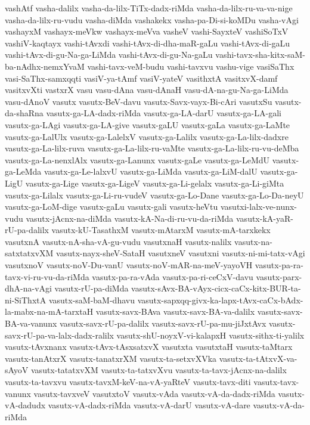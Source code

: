 {vashAtf
vasha-dalilx
vasha-da-lilx-TiTx-dadx-riMda
vasha-da-lilx-ru-va-va-nige
vasha-da-lilx-ru-vudu
vasha-diMda
vashakekx
vasha-pa-Di-si-koMDu
vasha-vAgi
vashayxM
vashayx-meVkw
vashayx-meVva
vasheV
vashi-SayxteV
vashiSoTxV
vashiV-kaqtayx
vashi-tAvxdi
vashi-tAvx-di-dha-maR-gaLu
vashi-tAvx-di-gaLu
vashi-tAvx-di-gu-Na-ga-LiMda
vashi-tAvx-di-gu-Na-gaLu
vashi-tavx-sha-kitx-saM-ba-nAdhx-nemxYvaM
vashi-tavx-veM-budu
vashi-tavxvu
vashu-vige
vasiSaThx
vasi-SaThx-samxqqti
vasiV-ya-tAmf
vasiV-yateV
vasithxtA
vasitxvX-damf
vasitxvXti
vastxrX
vasu
vasu-dAna
vasu-dAnaH
vasu-dA-na-gu-Na-ga-LiMda
vasu-dAnoV
vasutx
vasutx-BeV-davu
vasutx-Savx-vayx-Bi-cAri
vasutxSu
vasutx-da-shaRna
vasutx-ga-LA-dadx-riMda
vasutx-ga-LA-darU
vasutx-ga-LA-gali
vasutx-ga-LAgi
vasutx-ga-LA-give
vasutx-gaLU
vasutx-gaLa
vasutx-ga-LaMte
vasutx-ga-LalUlx
vasutx-ga-LalelxV
vasutx-ga-Lalilx
vasutx-ga-La-lilx-dadxre
vasutx-ga-La-lilx-ruva
vasutx-ga-La-lilx-ru-vaMte
vasutx-ga-La-lilx-ru-vu-deMba
vasutx-ga-La-nenxlAlx
vasutx-ga-Lanunx
vasutx-gaLe
vasutx-ga-LeMdU
vasutx-ga-LeMda
vasutx-ga-Le-lalxvU
vasutx-ga-LiMda
vasutx-ga-LiM-dalU
vasutx-ga-LigU
vasutx-ga-Lige
vasutx-ga-LigeV
vasutx-ga-Li-gelalx
vasutx-ga-Li-giMta
vasutx-ga-Lilalx
vasutx-ga-Li-ru-vudeV
vasutx-ga-Lo-Dane
vasutx-ga-Lo-Da-neyU
vasutx-ga-LoM-dige
vasutx-gaLu
vasutx-gali
vasutx-heVtu
vasutxi-lalx-ve-nunx-vudu
vasutx-jAcnx-na-diMda
vasutx-kA-Na-di-ru-vu-da-riMda
vasutx-kA-yaR-rU-pa-dalilx
vasutx-kU-TasathxM
vasutx-mAtarxM
vasutx-mA-tarxkekx
vasutxnA
vasutx-nA-sha-vA-gu-vudu
vasutxnaH
vasutx-nalilx
vasutx-na-satxtatxvXM
vasutx-nayx-sheV-SataH
vasutxneV
vasutxni
vasutx-ni-mi-tatx-vAgi
vasutxnoV
vasutx-noV-Du-vanU
vasutx-noV-mAR-na-meV-yayoVH
vasutx-pa-ra-tavx-vi-ru-vu-da-riMda
vasutx-pa-ra-vAda
vasutx-pa-ri-ceCxV-davu
vasutx-parx-dhA-na-vAgi
vasutx-rU-pa-diMda
vasutx-sAvx-BA-vAyx-cicx-caCx-kitx-BUR-ta-ni-SiThxtA
vasutx-saM-baM-dhavu
vasutx-sapxqq-givx-ka-lapx-tAvx-caCx-bAdx-la-mabx-na-mA-tarxtaH
vasutx-savx-BAva
vasutx-savx-BA-va-dalilx
vasutx-savx-BA-va-vanunx
vasutx-savx-rU-pa-dalilx
vasutx-savx-rU-pa-mu-jiJxtAvx
vasutx-savx-rU-pa-va-lalx-dadx-ralilx
vasutx-shU-noyxV-vi-kalapxH
vasutx-sithx-ti-yalilx
vasutx-tAvxnanx
vasutx-tAvx-tAsxsatxvX
vasutxta
vasutxtaH
vasutx-taMtarx
vasutx-tanAtxrX
vasutx-tanatxrXM
vasutx-ta-setxvXVka
vasutx-ta-tAtxvX-va-sAyoV
vasutx-tatatxvXM
vasutx-ta-tatxvXvu
vasutx-ta-tavx-jAcnx-na-dalilx
vasutx-ta-tavxvu
vasutx-tavxM-keV-na-vA-yaRteV
vasutx-tavx-diti
vasutx-tavx-vanunx
vasutx-tavxveV
vasutxtoV
vasutx-vAda
vasutx-vA-da-dadx-riMda
vasutx-vA-dadudx
vasutx-vA-dadx-riMda
vasutx-vA-darU
vasutx-vA-dare
vasutx-vA-da-riMda
}
